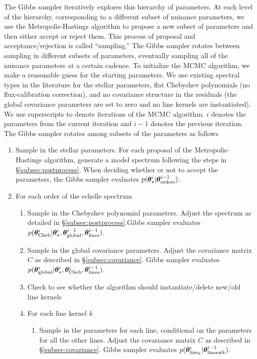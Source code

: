 \documentclass[iop,floatfix]{emulateapj}
\newcommand{\vt}{ {\bm \theta}}
\newcommand{\vtstar}{\vt_{\star}}
\newcommand{\vtcheb}{\vt_{\rm Cheb}}
\newcommand{\vtglobal}{\vt_{\rm global}}
\newcommand{\vtorders}{\vt_{\rm orders}}
\newcommand{\vtline}[1]{\vt_{{\rm line}_{#1}}}
\newcommand{\vtlines}{\vt_{\rm lines}}
\begin{document}
The Gibbs sampler iteratively explores this hierarchy of parameters. At each level of the hierarchy, corresponding to a different subset of nuisance parameters, we use the Metropolis-Hastings algorithm to propose a new subset of parameters and then either accept or reject them. This process of proposal and acceptance/rejection is called ``sampling.'' The Gibbs sampler rotates between sampling in different subsets of parameters, eventually sampling all of the nuisance parameters at a certain cadence. To initialize the MCMC algorithm, we make a reasonable guess for the starting parameters. We use existing spectral types in the literature for the stellar parameters, flat Chebyshev polynomials (no flux-calibration correction), and no covariance structure in the residuals (the global covariance parameters are set to zero and no line kernels are instantiated). We use superscripts to denote iterations of the MCMC algorithm. $i$ denotes the parameters from the current iteration and $i - 1$ denotes the previous iteration. The Gibbs sampler rotates among subsets of the parameters as follows 

\begin{enumerate}
  \item Sample in the stellar parameters. For each proposal of the Metropolis-Hastings algorithm, generate a model spectrum following the steps in \S\ref{subsec:postprocess}. When deciding whether or not to accept the parameters, the Gibbs sampler evaluates $p(\vtstar^i | \vtorders^{i-1})$.
  \item For each order of the echelle spectrum
    \begin{enumerate}
      \item Sample in the Chebyshev polynomial parameters. Adjust the spectrum as detailed in \S\ref{subsec:postprocess}.Gibbs sampler evaluates $p(\vtcheb^{i} | \vtstar^{i}, \vtglobal^{i -1}, \vtlines^{i-1})$.
      \item Sample in the global covariance parameters. Adjust the covariance matrix $C$ as described in \S\ref{subsec:covariance}. Gibbs sampler evaluates $p(\vtglobal^{i}| \vtstar^{i}, \vtcheb^{i}, \vtlines^{i -1})$.

      \item Check to see whether the algorithm should instantiate/delete new/old line kernels
      \item For each line kernel $k$
	\begin{enumerate}
	  \item Sample in the parameters for each line, conditional on the parameters for all the other lines. Adjust the covariance matrix $C$ as described in \S\ref{subsec:covariance}. Gibbs sampler evaluates $p(\vtline{k}^i| \vt_{\textrm{lines}\ne k}^{i - 1})$.
	\end{enumerate}
    \end{enumerate}
\end{enumerate}
\end{document}
